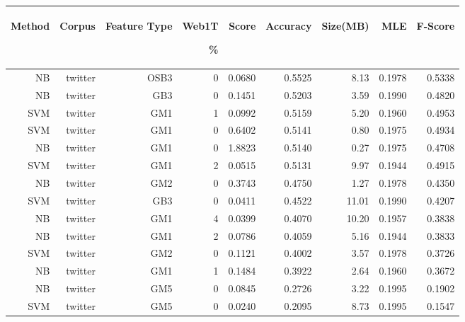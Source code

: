 \begin{table}[htbp!]
	\begin{center}
		\begin{tabular}{ | r | r | r | r | r | r | r | r| r | }
			\hline
			\begin{sideways}Method\end{sideways} & \begin{sideways}Corpus\end{sideways} & \begin{sideways}Feature Type\end{sideways} & \begin{sideways}Web1T\end{sideways} \% & \begin{sideways}Score\end{sideways} & \begin{sideways}Accuracy\end{sideways} & \begin{sideways}Size(MB)\end{sideways} &\begin{sideways}MLE\end{sideways} & \begin{sideways}F-Score\end{sideways}\\ \hline

NB & twitter & OSB3 & 0 & 0.0680 & 0.5525 & 8.13 & 0.1978 & 0.5338\\ \hline 
NB & twitter & GB3 & 0 & 0.1451 & 0.5203 & 3.59 & 0.1990 & 0.4820\\ \hline 
SVM & twitter & GM1 & 1 & 0.0992 & 0.5159 & 5.20 & 0.1960 & 0.4953\\ \hline 
SVM & twitter & GM1 & 0 & 0.6402 & 0.5141 & 0.80 & 0.1975 & 0.4934\\ \hline 
NB & twitter & GM1 & 0 & 1.8823 & 0.5140 & 0.27 & 0.1975 & 0.4708\\ \hline 
SVM & twitter & GM1 & 2 & 0.0515 & 0.5131 & 9.97 & 0.1944 & 0.4915\\ \hline 
NB & twitter & GM2 & 0 & 0.3743 & 0.4750 & 1.27 & 0.1978 & 0.4350\\ \hline 
SVM & twitter & GB3 & 0 & 0.0411 & 0.4522 & 11.01 & 0.1990 & 0.4207\\ \hline 
NB & twitter & GM1 & 4 & 0.0399 & 0.4070 & 10.20 & 0.1957 & 0.3838\\ \hline 
NB & twitter & GM1 & 2 & 0.0786 & 0.4059 & 5.16 & 0.1944 & 0.3833\\ \hline 
SVM & twitter & GM2 & 0 & 0.1121 & 0.4002 & 3.57 & 0.1978 & 0.3726\\ \hline 
NB & twitter & GM1 & 1 & 0.1484 & 0.3922 & 2.64 & 0.1960 & 0.3672\\ \hline 
NB & twitter & GM5 & 0 & 0.0845 & 0.2726 & 3.22 & 0.1995 & 0.1902\\ \hline 
SVM & twitter & GM5 & 0 & 0.0240 & 0.2095 & 8.73 & 0.1995 & 0.1547\\ \hline 


\end{tabular}
\end{center}
\end{table}
